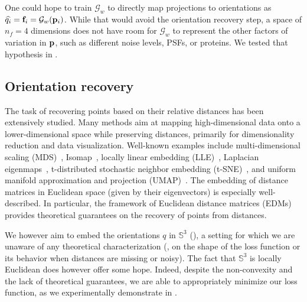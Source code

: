 One could hope to train $\mathcal{G}_w$ to directly map projections to orientations as $\widehat{q_i} = \mathbf{f}_i = \mathcal{G}_w(\mathbf{p}_i)$.
While that would avoid the orientation recovery step, a space of $n_f=4$ dimensions does not have room for $\mathcal{G}_w$ to represent the other factors of variation in $\mathbf{p}$, such as different noise levels, PSFs, or proteins.
We tested that hypothesis in .

\subsection{Orientation recovery}\label{sec:method:orientation-recovery}

The task of recovering points based on their relative distances has been extensively studied.
Many methods aim at mapping high-dimensional data onto a lower-dimensional space while preserving distances, primarily for dimensionality reduction and data visualization.
Well-known examples include multi-dimensional scaling (MDS)~\cite{cox2008mds}, Isomap~\cite{tenenbaum2000isomap}, locally linear embedding (LLE)~\cite{roweis2000lle}, Laplacian eigenmaps~\cite{belkin2003laplacian}, t-distributed stochastic neighbor embedding (t-SNE)~\cite{maaten2008tsne}, and uniform manifold approximation and projection (UMAP)~\cite{mcinnes2018umap}.
The embedding of distance matrices in Euclidean space (given by their eigenvectors) is especially well-described.
In particular, the framework of Euclidean distance matrices (EDMs)~\cite{dokmanic2015edm} provides theoretical guarantees on the recovery of points from distances.

We however aim to embed the orientations $q$ in $\mathbb{S}^3$ (), a setting for which we are unaware of any theoretical characterization (\eg, on the shape of the loss function or its behavior when distances are missing or noisy).
The fact that $\mathbb{S}^3$ is locally Euclidean does however offer some hope. %
Indeed, despite the non-convexity and the lack of theoretical guarantees, we are able to appropriately minimize our loss function, as we experimentally demonstrate in .

